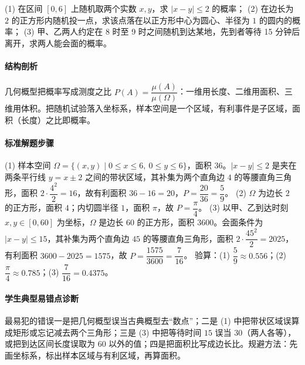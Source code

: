 \begin{problem}
(1) 在区间 $[0,6]$ 上随机取两个实数 $x,y$，求 $|x-y|\le2$ 的概率；
(2) 在边长为 $2$ 的正方形内随机投一点，求该点落在以正方形中心为圆心、半径为 $1$ 的圆内的概率；
(3) 甲、乙两人约定在 8 时至 9 时之间随机到达某地，先到者等待 15 分钟后离开，求两人能会面的概率。
\end{problem}
\begin{solution}
\paragraph{结构剖析}
几何概型把概率写成测度之比 $P(A)=\dfrac{\mu(A)}{\mu(\Omega)}$：一维用长度、二维用面积、三维用体积。把随机试验落入坐标系，样本空间是一个区域，有利事件是子区域，面积（长度）之比即概率。
\paragraph{标准解题步骤}
(1) 样本空间 $\Omega=\{(x,y)\mid 0\le x\le6,\ 0\le y\le6\}$，面积 $36$。$|x-y|\le2$ 是夹在两条平行线 $y=x\pm2$ 之间的带状区域，其补集为两个直角边 $4$ 的等腰直角三角形，面积 $2\cdot\dfrac{4^2}{2}=16$，故有利面积 $36-16=20$，$P=\dfrac{20}{36}=\dfrac59$。
(2) $\Omega$ 为边长 $2$ 的正方形，面积 $4$；内切圆半径 $1$，面积 $\pi$，故 $P=\dfrac{\pi}{4}$。
(3) 以甲、乙到达时刻 $x,y\in[0,60]$ 为坐标，$\Omega$ 是边长 $60$ 的正方形，面积 $3600$。会面条件为 $|x-y|\le15$，其补集为两个直角边 $45$ 的等腰直角三角形，面积 $2\cdot\dfrac{45^2}{2}=2025$，有利面积 $3600-2025=1575$，故 $P=\dfrac{1575}{3600}=\dfrac{7}{16}$。
验算：(1) $\dfrac59\approx0.556$；(2) $\dfrac{\pi}{4}\approx0.785$；(3) $\dfrac{7}{16}=0.4375$。
\paragraph{学生典型易错点诊断}
最易犯的错误一是把几何概型误当古典概型去“数点”；二是 (1) 中把带状区域误算成矩形或忘记减去两个三角形；三是 (3) 中把等待时间 $15$ 误当 $30$（两人各等），或把到达区间长度误取为 $60$ 以外的值；四是把面积比写成边长比。规避方法：先画坐标系，标出样本区域与有利区域，再算面积。
\end{solution}

